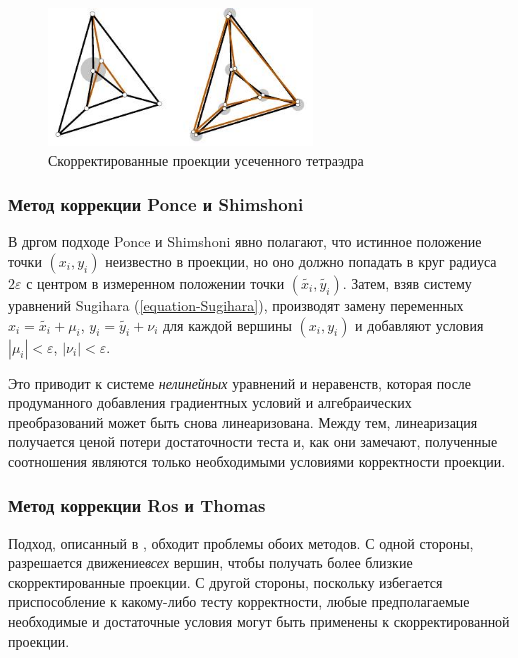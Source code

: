 \documentclass[a4paper,12pt, titlepage]{article}
\begin{document}
\begin{flushleft}
	\begin{figure}[thb]
	    \includegraphics[width=7cm]{img/ros-thomas-two-corrections.jpeg}
	    \caption{Скорректированные проекции усеченного тетраэдра}
	    \label{two-corrections}
	\end{figure}
\end{flushleft}


\subsubsection{Метод коррекции Ponce и Shimshoni}

\begin{flushleft}
      В дргом подходе Ponce и Shimshoni явно полагают, что истинное положение точки 
$(x_{i}, y_{i})$ неизвестно в проекции, но оно должно попадать в круг радиуса $2\varepsilon$
с центром в измеренном положении точки $(\widetilde{x_{i}}, \widetilde{y_{i}})$.
Затем, взяв систему уравнений Sugihara (\ref{equation-Sugihara}), производят замену 
переменных $x_{i} = \widetilde{x_{i}} + \mu_{i}$, $y_{i} = \widetilde{y_{i}} + \nu_{i}$ для
каждой вершины $(x_{i}, y_{i})$ и добавляют условия $|\mu_{i}| < \varepsilon$, 
$|\nu_{i}| < \varepsilon$.
\end{flushleft}

\begin{flushleft}
      Это приводит к системе \textit{нелинейных} уравнений и неравенств, которая после 
продуманного добавления градиентных условий и алгебраических преобразований может быть
снова линеаризована. Между тем, линеаризация получается ценой потери достаточности теста и,
как они замечают, полученные соотношения являются только необходимыми условиями корректности
проекции.
\end{flushleft}

\subsubsection{Метод коррекции Ros и Thomas}

\begin{flushleft}
      Подход, описанный в \cite{Ros-Thomas}, обходит проблемы обоих методов. С одной стороны, 
разрешается движение\textit{всех} вершин, чтобы получать более близкие скорректированные проекции. 
С другой стороны, поскольку избегается приспособление к какому-либо тесту корректности, 
любые предполагаемые необходимые и достаточные условия могут быть применены 
к скорректированной проекции.
\end{flushleft}
\end{document}
